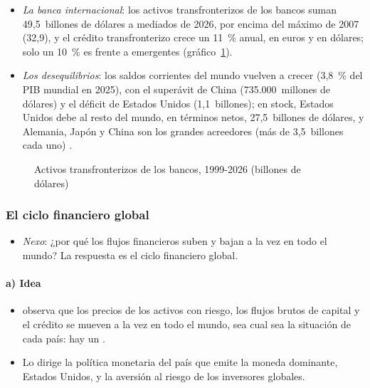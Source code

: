\documentclass[11pt]{article}
\begin{document}
\begin{itemize}
\item \emph{La banca internacional}: los activos transfronterizos de los bancos suman 49,5~billones de dólares a mediados de 2026, por encima del máximo de 2007 (32,9), y el crédito transfronterizo crece un 11~\% anual, en euros y en dólares; solo un 10~\% es frente a emergentes (gráfico~\ref{fig:bancos})\nocite{BPI2026LBS,BPI2026Comentario}.
\item \emph{Los desequilibrios}: los saldos corrientes del mundo vuelven a crecer (3,8~\% del PIB mundial en 2025), con el superávit de China (735.000~millones de dólares) y el déficit de Estados Unidos (1,1~billones); en stock, Estados Unidos debe al resto del mundo, en términos netos, 27,5~billones de dólares, y Alemania, Japón y China son los grandes acreedores (más de 3,5~billones cada uno)\nocite{FMI2026ESR} .
\end{itemize}

\begin{figure}[H]
\centering
\caption{Activos transfronterizos de los bancos, 1999-2026 (billones de dólares)}\label{fig:bancos}
\end{figure}

\subsubsection{El ciclo financiero global}\label{sec:ciclo-global}

\begin{itemize}
\item \emph{Nexo}: ¿por qué los flujos financieros suben y bajan a la vez en todo el mundo? La respuesta es el ciclo financiero global.
\end{itemize}

\paragraph{a) Idea}

\begin{itemize}
\item \textcite{Rey2013Dilema} observa que los precios de los activos con riesgo, los flujos brutos de capital y el crédito se mueven a la vez en todo el mundo, sea cual sea la situación de cada país: hay un .
\item Lo dirige la política monetaria del país que emite la moneda dominante, Estados Unidos, y la aversión al riesgo de los inversores globales.
\end{itemize}
\end{document}
